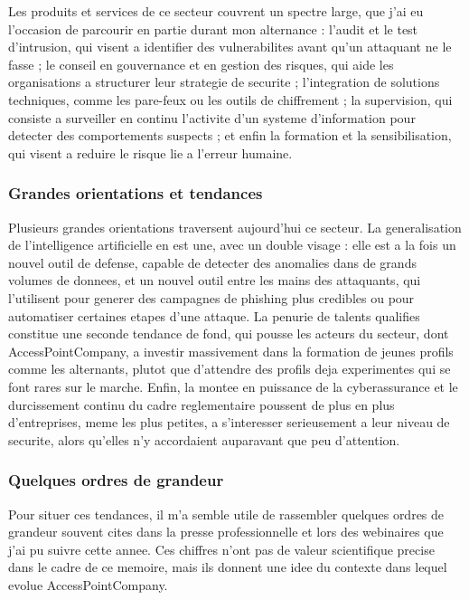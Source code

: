 \documentclass[11pt,a4paper]{article}
\begin{document}
Les produits et services de ce secteur couvrent un spectre large, que j'ai eu l'occasion de parcourir en partie durant mon alternance : l'audit et le test d'intrusion, qui visent a identifier des vulnerabilites avant qu'un attaquant ne le fasse ; le conseil en gouvernance et en gestion des risques, qui aide les organisations a structurer leur strategie de securite ; l'integration de solutions techniques, comme les pare-feux ou les outils de chiffrement ; la supervision, qui consiste a surveiller en continu l'activite d'un systeme d'information pour detecter des comportements suspects ; et enfin la formation et la sensibilisation, qui visent a reduire le risque lie a l'erreur humaine.

\subsubsection*{Grandes orientations et tendances}

Plusieurs grandes orientations traversent aujourd'hui ce secteur. La generalisation de l'intelligence artificielle en est une, avec un double visage : elle est a la fois un nouvel outil de defense, capable de detecter des anomalies dans de grands volumes de donnees, et un nouvel outil entre les mains des attaquants, qui l'utilisent pour generer des campagnes de phishing plus credibles ou pour automatiser certaines etapes d'une attaque. La penurie de talents qualifies constitue une seconde tendance de fond, qui pousse les acteurs du secteur, dont AccessPointCompany, a investir massivement dans la formation de jeunes profils comme les alternants, plutot que d'attendre des profils deja experimentes qui se font rares sur le marche. Enfin, la montee en puissance de la cyberassurance et le durcissement continu du cadre reglementaire poussent de plus en plus d'entreprises, meme les plus petites, a s'interesser serieusement a leur niveau de securite, alors qu'elles n'y accordaient auparavant que peu d'attention.

\subsubsection*{Quelques ordres de grandeur}

Pour situer ces tendances, il m'a semble utile de rassembler quelques ordres de grandeur souvent cites dans la presse professionnelle et lors des webinaires que j'ai pu suivre cette annee. Ces chiffres n'ont pas de valeur scientifique precise dans le cadre de ce memoire, mais ils donnent une idee du contexte dans lequel evolue AccessPointCompany.
\end{document}
